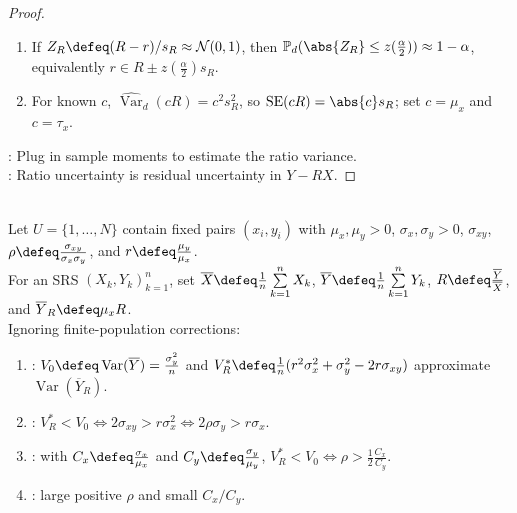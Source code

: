 \begin{corollary}
\begin{proof}
\begin{enumerate}[label=(\roman*)]
\item If $Z_R\defeq(R-r)/s_R\approx\mathcal{N}(0,1)$, then $\mathbb{P}_d(\abs{Z_R}\leq z(\frac{\alpha}{2}))\approx1-\alpha$, equivalently $r\in R\pm z(\frac{\alpha}{2})s_R$.
\item For known $c$, $\widehat{\operatorname{Var}}_d(cR)=c^2s_R^2$, so $\operatorname{SE}(cR)=\abs{c}s_R$; set $c=\mu_x$ and $c=\tau_x$.
\end{enumerate}
: Plug in sample moments to estimate the ratio variance.\\
: Ratio uncertainty is residual uncertainty in $Y-RX$.
\end{proof}
\end{corollary}

\begin{method} \label{meth:when-ratio-estimation-helps} \\
Let $U=\{1,\ldots,N\}$ contain fixed pairs $(x_i,y_i)$ with $\mu_x,\mu_y>0$, $\sigma_x,\sigma_y>0$, $\sigma_{xy}$, $\rho\defeq\frac{\sigma_{xy}}{\sigma_x\sigma_y}$, and $r\defeq\frac{\mu_y}{\mu_x}$.\\
For an SRS $(X_k,Y_k)_{k=1}^{n}$, set $\overline{X}\defeq\frac1n\sum\limits_{k=1}^{n}X_k$, $\overline{Y}\defeq\frac1n\sum\limits_{k=1}^{n}Y_k$, $R\defeq\frac{\overline{Y}}{\overline{X}}$, and $\overline{Y}_R\defeq\mu_xR$.\\
Ignoring finite-population corrections:
\begin{enumerate}[label=(\roman*)]
\setlength{\itemsep}{0pt}
\item {}: $V_0\defeq\operatorname{Var}(\overline{Y})=\frac{\sigma_y^2}{n}$ and $V_R^\ast\defeq\frac1n(r^2\sigma_x^2+\sigma_y^2-2r\sigma_{xy})$ approximate $\operatorname{Var}(\overline{Y}_R)$.
\item {}: $V_R^\ast<V_0\iff 2\sigma_{xy}>r\sigma_x^2\iff 2\rho\sigma_y>r\sigma_x$.
\item {}: with $C_x\defeq\frac{\sigma_x}{\mu_x}$ and $C_y\defeq\frac{\sigma_y}{\mu_y}$, $V_R^\ast<V_0\iff \rho>\frac12\frac{C_x}{C_y}$.
\item {}: large positive $\rho$ and small $C_x/C_y$.
\end{enumerate}
\end{method}

